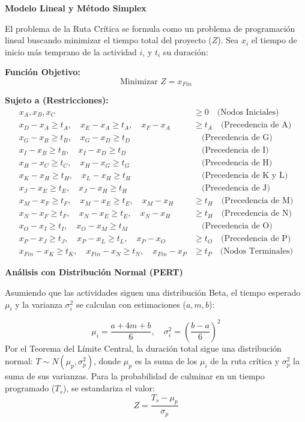 \documentclass[10pt,a4paper]{article}
\begin{document}
\vspace{0.3cm}
\textbf{Modelo Lineal y Método Simplex}

El problema de la Ruta Crítica se formula como un problema de programación lineal buscando minimizar el tiempo total del proyecto ($Z$). Sea $x_i$ el tiempo de inicio más temprano de la actividad $i$, y $t_i$ su duración:

\textbf{Función Objetivo:}
\[ \text{Minimizar } Z = x_{Fin} \]

\textbf{Sujeto a (Restricciones):}
\begin{align*}
x_A, x_B, x_C &\ge 0 \quad \text{(Nodos Iniciales)}\\
x_D - x_A \ge t_A, \quad x_E - x_A \ge t_A, \quad x_F - x_A &\ge t_A \quad \text{(Precedencia de A)}\\
x_G - x_B \ge t_B, \quad x_G - x_D \ge t_D &\quad \text{(Precedencia de G)}\\
x_I - x_B \ge t_B, \quad x_I - x_D \ge t_D &\quad \text{(Precedencia de I)}\\
x_H - x_C \ge t_C, \quad x_H - x_G \ge t_G &\quad \text{(Precedencia de H)}\\
x_K - x_H \ge t_H, \quad x_L - x_H \ge t_H &\quad \text{(Precedencia de K y L)}\\
x_J - x_E \ge t_E, \quad x_J - x_H \ge t_H &\quad \text{(Precedencia de J)}\\
x_M - x_F \ge t_F, \quad x_M - x_E \ge t_E, \quad x_M - x_H &\ge t_H \quad \text{(Precedencia de M)}\\
x_N - x_F \ge t_F, \quad x_N - x_E \ge t_E, \quad x_N - x_H &\ge t_H \quad \text{(Precedencia de N)}\\
x_O - x_I \ge t_I, \quad x_O - x_M \ge t_M &\quad \text{(Precedencia de O)}\\
x_P - x_J \ge t_J, \quad x_P - x_L \ge t_L, \quad x_P - x_O &\ge t_O \quad \text{(Precedencia de P)}\\
x_{Fin} - x_K \ge t_K, \quad x_{Fin} - x_N \ge t_N, \quad x_{Fin} - x_P &\ge t_P \quad \text{(Nodos Terminales)}
\end{align*}


\vspace{0.3cm}
\textbf{Análisis con Distribución Normal (PERT)}

Asumiendo que las actividades siguen una distribución Beta, el tiempo esperado $\mu_i$ y la varianza $\sigma_i^2$ se calculan con estimaciones ($a, m, b$):

\[ \mu_i = \frac{a + 4m + b}{6}, \quad \sigma_i^2 = \left(\frac{b - a}{6}\right)^2 \]
Por el Teorema del Límite Central, la duración total sigue una distribución normal: $T \sim N(\mu_p, \sigma_p^2)$, donde $\mu_p$ es la suma de los $\mu_i$ de la ruta crítica y $\sigma_p^2$ la suma de sus varianzas. Para la probabilidad de culminar en un tiempo programado ($T_s$), se estandariza el valor:
\[ Z = \frac{T_s - \mu_p}{\sigma_p} \]
\end{document}
